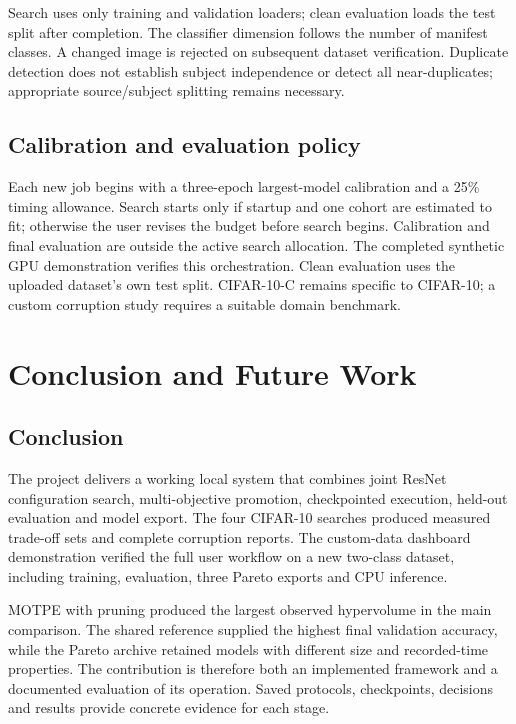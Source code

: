 \documentclass[11pt,a4paper,oneside]{report}
\begin{document}
Search uses only training and validation loaders; clean evaluation loads the test split after completion. The classifier dimension follows the number of manifest classes. A changed image is rejected on subsequent dataset verification. Duplicate detection does not establish subject independence or detect all near-duplicates; appropriate source/subject splitting remains necessary.

\section{Calibration and evaluation policy}

Each new job begins with a three-epoch largest-model calibration and a 25\% timing allowance. Search starts only if startup and one cohort are estimated to fit; otherwise the user revises the budget before search begins. Calibration and final evaluation are outside the active search allocation. The completed synthetic GPU demonstration verifies this orchestration. Clean evaluation uses the uploaded dataset's own test split. CIFAR-10-C remains specific to CIFAR-10; a custom corruption study requires a suitable domain benchmark.
\chapter{Conclusion and Future Work}
\section{Conclusion}
The project delivers a working local system that combines joint ResNet configuration search, multi-objective promotion, checkpointed execution, held-out evaluation and model export. The four CIFAR-10 searches produced measured trade-off sets and complete corruption reports. The custom-data dashboard demonstration verified the full user workflow on a new two-class dataset, including training, evaluation, three Pareto exports and CPU inference.

MOTPE with pruning produced the largest observed hypervolume in the main comparison. The shared reference supplied the highest final validation accuracy, while the Pareto archive retained models with different size and recorded-time properties. The contribution is therefore both an implemented framework and a documented evaluation of its operation. Saved protocols, checkpoints, decisions and results provide concrete evidence for each stage.
\end{document}
